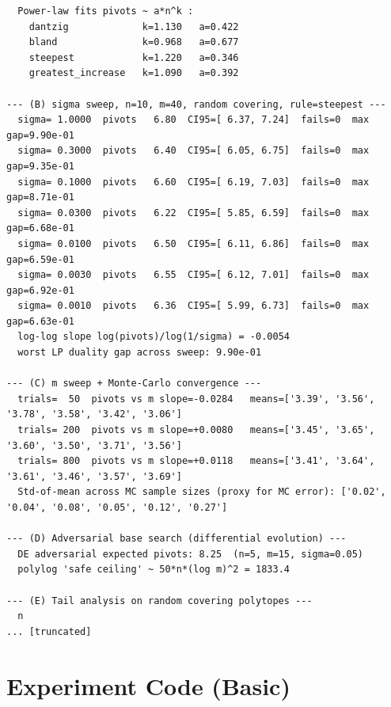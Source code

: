 \documentclass[11pt]{article}
\begin{document}
\begin{lstlisting}
  Power-law fits pivots ~ a*n^k :
    dantzig             k=1.130   a=0.422
    bland               k=0.968   a=0.677
    steepest            k=1.220   a=0.346
    greatest_increase   k=1.090   a=0.392

--- (B) sigma sweep, n=10, m=40, random covering, rule=steepest ---
  sigma= 1.0000  pivots   6.80  CI95=[ 6.37, 7.24]  fails=0  max gap=9.90e-01
  sigma= 0.3000  pivots   6.40  CI95=[ 6.05, 6.75]  fails=0  max gap=9.35e-01
  sigma= 0.1000  pivots   6.60  CI95=[ 6.19, 7.03]  fails=0  max gap=8.71e-01
  sigma= 0.0300  pivots   6.22  CI95=[ 5.85, 6.59]  fails=0  max gap=6.68e-01
  sigma= 0.0100  pivots   6.50  CI95=[ 6.11, 6.86]  fails=0  max gap=6.59e-01
  sigma= 0.0030  pivots   6.55  CI95=[ 6.12, 7.01]  fails=0  max gap=6.92e-01
  sigma= 0.0010  pivots   6.36  CI95=[ 5.99, 6.73]  fails=0  max gap=6.63e-01
  log-log slope log(pivots)/log(1/sigma) = -0.0054
  worst LP duality gap across sweep: 9.90e-01

--- (C) m sweep + Monte-Carlo convergence ---
  trials=  50  pivots vs m slope=-0.0284   means=['3.39', '3.56', '3.78', '3.58', '3.42', '3.06']
  trials= 200  pivots vs m slope=+0.0080   means=['3.45', '3.65', '3.60', '3.50', '3.71', '3.56']
  trials= 800  pivots vs m slope=+0.0118   means=['3.41', '3.64', '3.61', '3.46', '3.57', '3.69']
  Std-of-mean across MC sample sizes (proxy for MC error): ['0.02', '0.04', '0.08', '0.05', '0.12', '0.27']

--- (D) Adversarial base search (differential evolution) ---
  DE adversarial expected pivots: 8.25  (n=5, m=15, sigma=0.05)
  polylog 'safe ceiling' ~ 50*n*(log m)^2 = 1833.4

--- (E) Tail analysis on random covering polytopes ---
  n
... [truncated]
\end{lstlisting}


\section{Experiment Code (Basic)}
\end{document}
